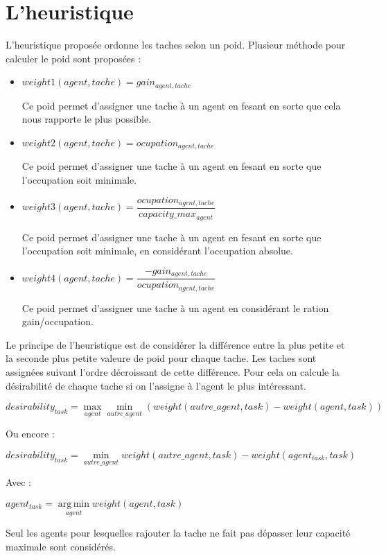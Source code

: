 \documentclass{article}
\begin{document}
\section{L'heuristique}

L'heuristique proposée ordonne les taches selon un poid. Plusieur méthode pour calculer le poid sont proposées :
\begin{itemize} \item $weight1 (agent,tache) = gain_{agent,tache}$

Ce poid permet d'assigner une tache à un agent en fesant en sorte que cela nous rapporte le plus possible.
\item $weight2 (agent,tache) = ocupation_{agent, tache}$

Ce poid permet d'assigner une tache à un agent en fesant en sorte que l'occupation soit minimale.
\item $weight3 (agent,tache) = \dfrac{ocupation_{agent,tache}}{capacity\_max_{agent}}$

Ce poid permet d'assigner une tache à un agent en fesant en sorte que l'occupation soit minimale, en considérant l'occupation absolue.
\item $weight4 (agent,tache) = \dfrac{-gain_{agent,tache}}{ocupation_{agent,tache}}$

Ce poid permet d'assigner une tache à un agent en considérant le ration gain/occupation.
\end{itemize}

Le principe de l'heuristique est de considérer la différence entre la plus petite et la seconde plus petite valeure de poid pour chaque tache. Les taches sont assignées suivant l'ordre décroissant de cette différence.
Pour cela on calcule la désirabilité de chaque tache si on l'assigne à l'agent le plus intéressant.

$desirability_{task} = \max\limits_{agent}\min\limits_{autre\_agent}(weight(autre\_agent,task) - weight(agent,task))$

Ou encore :

$desirability_{task} = \min\limits_{autre\_agent}weight(autre\_agent,task) - weight(agent_{task},task)$

Avec :

$agent_{task} = \operatorname*{arg\,min}\limits_{agent}weight(agent,task)$

Seul les agents pour lesquelles rajouter la tache ne fait pas dépasser leur capacité maximale sont considérés.
\end{document}

